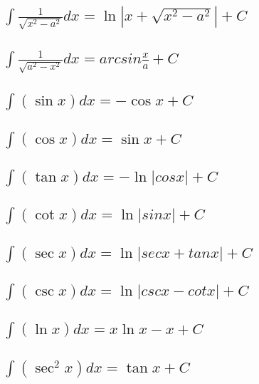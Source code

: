 \documentclass[UTF8]{ctexart}
\begin{document}
	
	
	
	\subsection{$\int \frac{1} {\sqrt{x^2 - a^2}}dx  =\ln | x+\sqrt{x^2-a^2}|+C$}
	
	
	\subsection{$\int \frac{1} {\sqrt{a^2 - x^2}}dx = arcsin \frac{x} {a}  +C$}
	
	\subsection{$\int (\sin x) dx = - \cos x + C$}
	
	
	\subsection{$ \int (\cos x) dx = \sin x + C$}
	
	\subsection{$\int (\tan x) dx = -\ln |cos x| + C$}
	
	\subsection{$ \int (\cot x) dx = \ln |sin x| + C$}
	
	\subsection{$\int (\sec x) dx = \ln |sec x + tan x| + C$}
	
	\subsection{$\int (\csc x) dx = \ln |csc x - cot x| + C$}
	
	\subsection{$\int (\ln x) dx = x \ln x - x + C$}
	
	\subsection{$ \int (\sec^2 x) dx = \tan x + C$}
	
\end{document}
